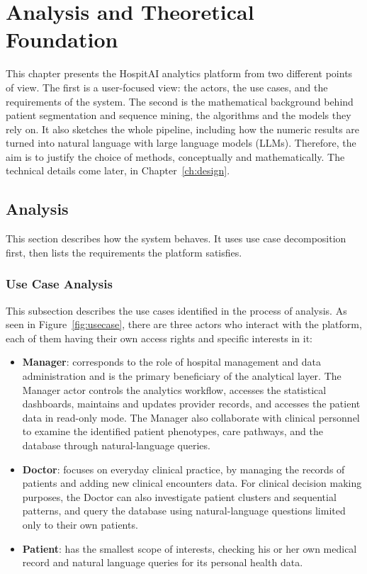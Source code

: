 \chapter{Analysis and Theoretical Foundation}
\label{ch:analysis}
\pagestyle{fancy}

This chapter presents the HospitAI analytics platform from two different points of view. The first is a user-focused view: the actors, the use cases, and the requirements of the system. The second is the mathematical background behind patient segmentation and sequence mining, the algorithms and the models they rely on. It also sketches the whole pipeline, including how the numeric results are turned into natural language with large language models (LLMs). Therefore, the aim is to justify the choice of methods, conceptually and mathematically. The technical details come later, in Chapter~\ref{ch:design}.

\section{Analysis}

This section describes how the system behaves. It uses use case decomposition first, then lists the requirements the platform satisfies.

\subsection{Use Case Analysis}

This subsection describes the use cases identified in the process of analysis. As seen in Figure~\ref{fig:usecase}, there are three actors who interact with the platform, each of them having their own access rights and specific interests in it:

\begin{itemize}
\item \textbf{Manager}: corresponds to the role of hospital management and data administration and is the primary beneficiary of the analytical layer. The Manager actor controls the analytics workflow, accesses the statistical dashboards, maintains and updates provider records, and accesses the patient data in read-only mode. The Manager also collaborate with clinical personnel to examine the identified patient phenotypes, care pathways, and the database through natural-language queries.
\item \textbf{Doctor}: focuses on everyday clinical practice, by managing the records of patients and adding new clinical encounters data. For clinical decision making purposes, the Doctor can also investigate patient clusters and sequential patterns, and query the database using natural-language questions limited only to their own patients.
\item \textbf{Patient}: has the smallest scope of interests, checking his or her own medical record and natural language queries for its personal health data.
\end{itemize}


